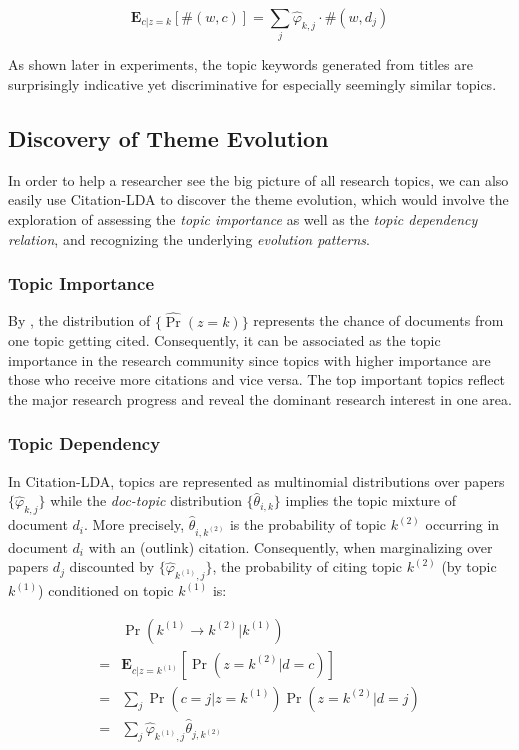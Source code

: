 \begin{equation}
  \mathbf{E}_{c | z=k} [\#(w, c)] =
    \sum\limits_j \hat\varphi_{k,j} \cdot \#(w, d_j)
\end{equation}

As shown later in experiments, the topic keywords generated from titles are
surprisingly indicative yet discriminative for especially seemingly similar
topics.

\subsection{Discovery of Theme Evolution}

In order to help a researcher see the big picture of all research topics, we can
also easily use Citation-LDA to discover the theme evolution, which would
involve the exploration of assessing the \emph{topic importance} as well as the
\emph{topic dependency relation}, and recognizing the underlying \emph{evolution
patterns}.

\subsubsection{Topic Importance}

By , the distribution of $\{\hat\Pr(z=k)\}$
represents the chance of documents from one topic getting cited. Consequently,
it can be associated as the topic importance in the research community since
topics with higher importance are those who receive more citations and vice
versa.  The top important topics reflect the major research progress and reveal
the dominant research interest in one area.

\subsubsection{Topic Dependency}

In Citation-LDA, topics are represented as multinomial distributions over papers
$\{\hat\varphi_{k,j}\}$ while the \emph{doc-topic} distribution
$\{\hat\theta_{i,k}\}$ implies the topic mixture of document $d_i$.  More
precisely, $\hat\theta_{i,k^{(2)}}$ is the probability of topic $k^{(2)}$
occurring in document $d_i$ with an (outlink) citation.  Consequently, when
marginalizing over papers $d_j$ discounted by $\{\hat\varphi_{k^{(1)},j}\}$, the
probability of citing topic $k^{(2)}$ (by topic $k^{(1)}$) conditioned on topic
$k^{(1)}$ is:

\begin{align}
 & \Pr(k^{(1)} \rightarrow k^{(2)} | k^{(1)}) \nonumber \\
=& \mathbf{E}_{c | z=k^{(1)}}[\Pr(z= k^{(2)} |d = c)] \nonumber \\
=& \sum\limits_j \Pr( c = j| z = k^{(1)} ) \Pr(z = k^{(2)} |  d = j) \nonumber \\
=& \sum\limits_j \hat\varphi_{k^{(1)},j} \hat\theta_{j, k^{(2)}}
  \label{eq::citation_lda_citation_structure}
\end{align}

